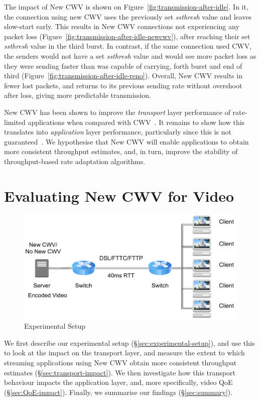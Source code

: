 \documentclass[10pt,sigconf,anonymous]{acmart}
\begin{document}
The impact of New CWV is shown on Figure~\ref{fig:transmission-after-idle}. In it, the connection using new CWV uses the previously set \emph{ssthresh} value and leaves slow-start early. This results in New CWV connections not experiencing any packet loss (Figure~\ref{fig:transmission-after-idle-newcwv}), after reaching their set \emph{ssthresh} value in the third burst. In contrast, if the same connection used CWV, the senders would not have a set \emph{ssthresh} value and would see more packet loss as they were sending faster than was capable of carrying, forth burst and end of third (Figure~\ref{fig:transmission-after-idle-reno}). Overall, New CWV results in fewer lost packets, and returns to its previous sending rate without overshoot after loss, giving more predictable transmission.

New CWV has been shown to improve the \emph{transport} layer performance of rate-limited applications when compared with CWV~\cite{Nazir-2014-performance-evaluation-congestion-window-validation-dash-newcwv}. It remains to show how this translates into \emph{application} layer performance, particularly since this is not guaranteed~\cite{Spiteri-2016-BOLA}. We hypothesise that New CWV will enable applications to obtain more consistent throughput estimates, and, in turn, improve the stability of throughput-based rate adaptation algorithms.

\section{Evaluating New CWV for Video}
\label{sec:evaluation}

\begin{figure}
  \centering
  \includegraphics[width=.5\textwidth]{figures/setup.pdf}
  \caption{Experimental Setup}
  \label{fig:experimental-setup}
\end{figure}

We first describe our experimental setup (\S\ref{sec:experimental-setup}), and use this to look at the impact on the transport layer, and measure the extent to which streaming applications using New CWV obtain more consistent throughput estimates (\S\ref{sec:transport-impact}). We then investigate how this transport behaviour impacts the application layer, and, more specifically, video QoE (\S\ref{sec:QoE-impact}). Finally,  we summarise our findings (\S\ref{sec:summary}).
\end{document}
